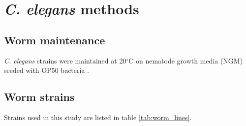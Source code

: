 \documentclass[12pt]{"report"}
\begin{document}
\section{\textit{C. elegans} methods}

\subsection{Worm maintenance}

\textit{C. elegans} strains were maintained at 20$^{\circ}$C on nematode growth media (NGM) seeded with OP50 bacteria \citep{Stiernagle2006}. 


\subsection{Worm strains}

Strains used in this study are listed in table \ref{tab:worm_lines}.\\
\end{document}

